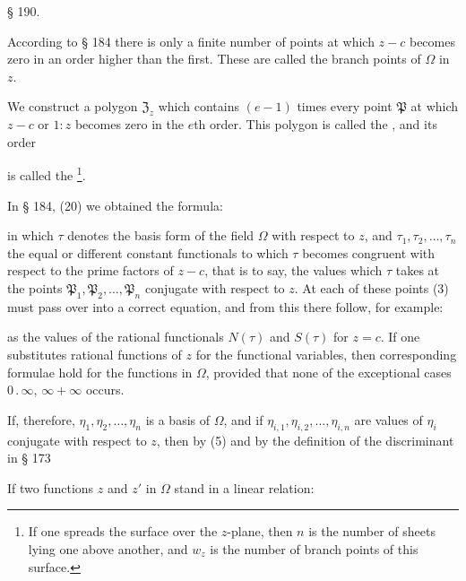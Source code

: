 \begin{center}
§ 190. 
\end{center}

According to § 184 there is only a finite number of points at which $z-c$ becomes zero in an order higher than the first. These are called the branch points of $\Omega$ in $z$.

We construct a polygon $\mathfrak{Z}_z$ which contains $(e-1)$ times every point $\mathfrak{P}$ at which $z-c$ or $1:z$ becomes zero in the $e$th order. This polygon is called the , and its order


is called the \footnote{If one spreads the  surface over the $z$-plane, then $n$ is the number of sheets lying one above another, and $w_z$ is the number of branch points of this surface.}.

In § 184, (20) we obtained the formula:


in which $\tau$ denotes the basis form of the field $\Omega$ with respect to $z$, and $\tau_1, \tau_2, \ldots, \tau_n$ the equal or different constant functionals to which $\tau$ becomes congruent with respect to the prime factors of $z-c$, that is to say, the values which $\tau$ takes at the points $\mathfrak{P}_1, \mathfrak{P}_2, \ldots, \mathfrak{P}_n$ conjugate with respect to $z$. At each of these points (3) must pass over into a correct equation, and from this there follow, for example:



as the values of the rational functionals $N(\tau)$ and $S(\tau)$ for $z=c$. If one substitutes rational functions of $z$ for the functional variables, then corresponding formulae hold for the functions in $\Omega$, provided that none of the exceptional cases $0\,.\,\infty$, $\infty+\infty$ occurs.

If, therefore, $\eta_1, \eta_2, \ldots, \eta_n$ is a basis of $\Omega$, and if $\eta_{i,1}, \eta_{i,2}, \ldots, \eta_{i,n}$ are values of $\eta_i$ conjugate with respect to $z$, then by (5) and by the definition of the discriminant in § 173


If two functions $z$ and $z'$ in $\Omega$ stand in a linear relation:

